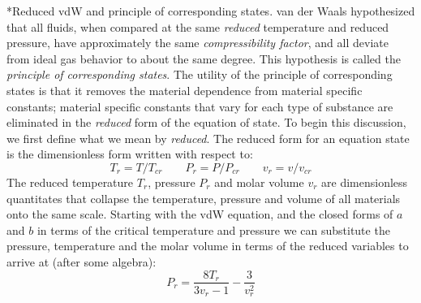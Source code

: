 \documentclass[11pt]{article}
\makeatletter
\theoremstyle{definition}
\renewcommand\paragraph{\@startsection
	{paragraph}{2}{0mm}
	{-0.05in}
	{-0.5\baselineskip}
	{\normalfont\normalsize\itshape}}
\makeatother
\begin{document}
\paragraph*{Reduced vdW and principle of corresponding states.}
van der Waals hypothesized that all fluids, when compared at the same \textit{reduced} temperature and reduced pressure,
have approximately the same \textit{compressibility factor}, and all deviate from ideal gas behavior to about the same degree.
This hypothesis is called the \textit{principle of corresponding states}.
The utility of the principle of corresponding states is that it removes the material dependence from material specific constants;
material specific constants that vary for each type of substance are eliminated in the \textit{reduced} form of the equation of state.
To begin this discussion, we first define what we mean by \textit{reduced}.
The reduced form for an equation state is the dimensionless form written with respect to:
\begin{equation}
	T_{r}=T/T_{cr}\qquad P_{r}=P/P_{cr}\qquad v_{r} = v/v_{cr}
\end{equation}The reduced temperature $T_{r}$, pressure $P_{r}$ and molar volume $v_{r}$ are dimensionless quantitates that collapse
the temperature, pressure and volume of all materials onto the same scale.
Starting with the vdW equation, and the closed forms of $a$ and $b$ in terms of the critical temperature and pressure we can substitute the pressure,
temperature and the molar volume in terms of the reduced variables to arrive at (after some algebra):
\begin{equation}
	P_{r} = \frac{8T_{r}}{3v_{r}-1}-\frac{3}{v_{r}^2}
\end{equation}
\end{document}
